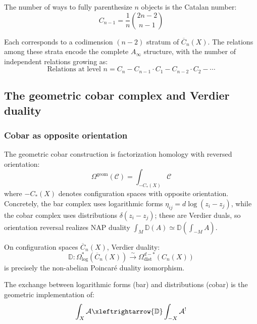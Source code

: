 \begin{theorem}\label{thm:catalan-parenthesization}
The number of ways to fully parenthesize $n$ objects is the Catalan number:
\[C_{n-1} = \frac{1}{n}\binom{2n-2}{n-1}\]

Each corresponds to a codimension $(n-2)$ stratum of $\overline{C}_n(X)$. The relations among these strata encode the complete $A_\infty$ structure, with the number of independent relations growing as:
\[\text{Relations at level } n = C_n - C_{n-1} \cdot C_1 - C_{n-2} \cdot C_2 - \cdots\]
\end{theorem}


\subsection{The geometric cobar complex and Verdier duality}

\subsubsection{Cobar as opposite orientation}

\begin{definition}\label{def:cobar-orientation}
The geometric cobar construction is factorization homology with reversed orientation:
\[\Omega^{\text{geom}}(\mathcal{C}) = \int_{-C_*(X)} \mathcal{C}\]
where $-C_*(X)$ denotes configuration spaces with opposite orientation.
Concretely, the bar complex uses logarithmic forms $\eta_{ij} = d\log(z_i - z_j)$, while the cobar complex uses distributions $\delta(z_i - z_j)$; these are Verdier duals, so orientation reversal realizes NAP duality $\int_M \mathbb{D}(A) \simeq \mathbb{D}(\int_{-M} A)$.
\end{definition}

\begin{theorem}[Verdier duality = NAP duality {\cite{AF15,KashiwaraSchapira}}; \ClaimStatusProvedElsewhere]\label{thm:verdier-NAP}
On configuration spaces $\overline{C}_n(X)$, Verdier duality:
\[\mathbb{D}: \Omega^*_{\log}(\overline{C}_n(X)) \xrightarrow{\sim} \Omega^{d-*}_{\text{dist}}(C_n(X))\]
is precisely the non-abelian Poincaré duality isomorphism.

The exchange between logarithmic forms (bar) and distributions (cobar) is the geometric implementation of:
\[\int_X \mathcal{A} \xleftrightarrow{\mathbb{D}} \int_{-X} \mathcal{A}^!\]
\end{theorem}

